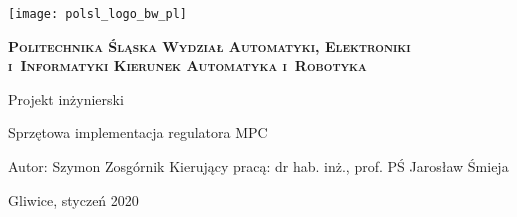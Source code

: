 \newpage
\thispagestyle{empty}
\begin{onehalfspacing}
\begin{center}
	\texttt{[image: polsl\_logo\_bw\_pl]}
	\vspace{0.8cm}
	
	\fontsize{18}{18} \selectfont
	\textbf{\textsc{Politechnika Śląska \linebreak
	Wydział Automatyki, Elektroniki i~Informatyki \linebreak
	Kierunek Automatyka i~Robotyka}}
	\vspace{1.3cm}
	
	\fontsize{16}{16} \selectfont
	Projekt inżynierski

	\vspace{1.7cm}
	
	\fontsize{14}{14} \selectfont
	Sprzętowa implementacja regulatora MPC
	\vspace{5cm}
	
	\begin{flushleft}
	Autor: Szymon Zosgórnik \linebreak
	Kierujący pracą: dr hab. inż., prof. PŚ Jarosław Śmieja \linebreak
	\end{flushleft}
	
	\vfill
	\fontsize{12}{12} \selectfont
	Gliwice, styczeń 2020
\end{center}
\end{onehalfspacing}
